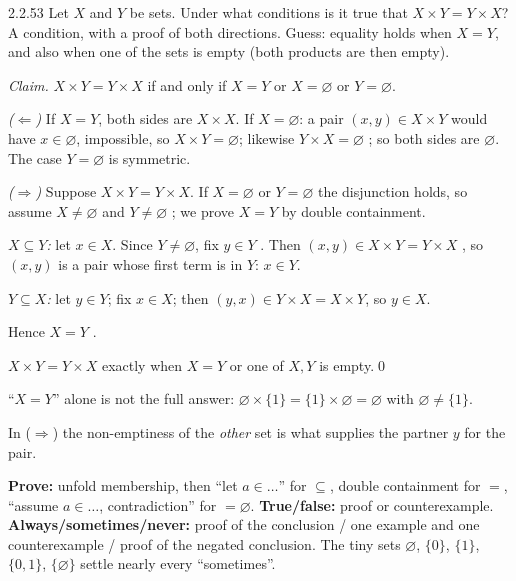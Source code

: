 \begin{bookex}[recommended]{2.2.53}
Let $X$ and $Y$ be sets. Under what conditions is it true that $X\times Y=Y\times X$?
\solution
\goal A condition, with a proof of both directions. Guess: equality holds when $X=Y$, and also when one of the sets is empty (both products are then empty).
\begin{steps}
\item \emph{Claim.} $X\times Y=Y\times X$ if and only if $X=Y$ or $X=\varnothing$ or $Y=\varnothing$.
\item \emph{($\Leftarrow$)} If $X=Y$, both sides are $X\times X$. If $X=\varnothing$: a pair $(x,y)\in X\times Y$ would have $x\in\varnothing$, impossible, so $X\times Y=\varnothing$; likewise $Y\times X=\varnothing$ ; so both sides are $\varnothing$. The case $Y=\varnothing$ is symmetric.
\item \emph{($\Rightarrow$)} Suppose $X\times Y=Y\times X$. If $X=\varnothing$ or $Y=\varnothing$ the disjunction holds, so assume $X\ne\varnothing$ and $Y\ne\varnothing$ ; we prove $X=Y$ by double containment.
\item \emph{$X\subseteq Y$:} let $x\in X$. Since $Y\ne\varnothing$, fix $y\in Y$ . Then $(x,y)\in X\times Y=Y\times X$ , so $(x,y)$ is a pair whose first term is in $Y$: $x\in Y$.
\item \emph{$Y\subseteq X$:} let $y\in Y$; fix $x\in X$; then $(y,x)\in Y\times X=X\times Y$, so $y\in X$.
\item Hence $X=Y$ .
\end{steps}
\conclusion $X\times Y=Y\times X$ exactly when $X=Y$ or one of $X,Y$ is empty.\qed
\begin{compare}
\item ``$X=Y$'' alone is not the full answer: $\varnothing\times\{1\}=\{1\}\times\varnothing=\varnothing$ with $\varnothing\ne\{1\}$.
\item In ($\Rightarrow$) the non-emptiness of the \emph{other} set is what supplies the partner $y$ for the pair.
\end{compare}
\end{bookex}


\begin{strategy}
\textbf{Prove:} unfold membership, then ``let $a\in\dots$'' for $\subseteq$, double containment for $=$, ``assume $a\in\dots$, contradiction'' for $=\varnothing$. \textbf{True/false:} proof or counterexample. \textbf{Always/sometimes/never:} proof of the conclusion / one example and one counterexample / proof of the negated conclusion. The tiny sets $\varnothing$, $\{0\}$, $\{1\}$, $\{0,1\}$, $\{\varnothing\}$ settle nearly every ``sometimes''.
\end{strategy}

